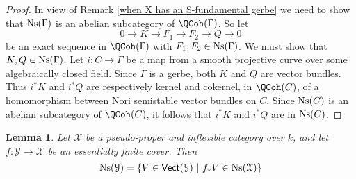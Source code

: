 \documentclass[12pt,reqno]{amsart}
\theoremstyle{plain}
\newtheorem{lem}[thm]{Lemma}
\theoremstyle{definition}
\numberwithin{thm}{section}
\newcounter{x}\setcounter{x}{1}
\theoremstyle{plain}
\begin{document}
\begin{proof}
In view of Remark \ref{when X has an S-fundamental gerbe} we need to show that ${\textup{Ns}}(\Gamma)$ is an
abelian subcategory of $\QCoh(\Gamma)$. So let
 \[
 0{\longrightarrow} K {\longrightarrow} F_1 {\longrightarrow} F_2 {\longrightarrow} Q {\longrightarrow} 0
 \]
 be an exact sequence in $\QCoh(\Gamma)$ with $F_1,F_2\in {\textup{Ns}}(\Gamma)$. We must show that
$K,Q\in {\textup{Ns}}(\Gamma)$. Let $i\colon C{\longrightarrow} \Gamma$ be a map from a smooth projective curve over
some algebraically closed field. Since $\Gamma$ is a gerbe, both $K$ and $Q$ are vector bundles. Thus
$i^*K$ and $i^*Q$ are respectively kernel and cokernel, in $\QCoh(C)$, of a homomorphism between Nori semistable
vector bundles on $C$. Since ${\textup{Ns}}(C)$ is an abelian subcategory of $\QCoh(C)$, it follows that $i^*K$ and $i^*Q$ are in ${\textup{Ns}}(C)$. 
\end{proof}

\begin{lem}\label{push of Nori semistable are Nori semistable}
Let ${\mathcal{X}}$ be a pseudo-proper and inflexible category over $k$, and let $f\colon {\mathcal{Y}}{\longrightarrow} {\mathcal{X}}$ be an essentially finite cover. Then
 $$
 {\textup{Ns}}({\mathcal{Y}})=\{ V \in {\text{\sf Vect}}({\mathcal{Y}}) {\ | \ } f_*V\in {\textup{Ns}}({\mathcal{X}}) \}
 $$
\end{lem}
\end{document}
